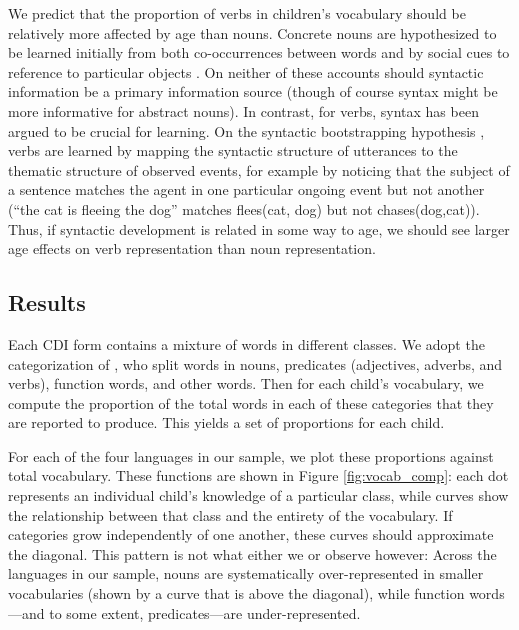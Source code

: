 \documentclass[10pt,letterpaper]{article}
\begin{document}
We predict that the proportion of verbs in children's vocabulary should be relatively more affected by age than nouns. Concrete nouns are hypothesized to be learned initially from both co-occurrences between words \cite{yu2007b} and by social cues to reference to particular objects \cite{bloom2002}. On neither of these accounts should syntactic information be a primary information source (though of course syntax might be more informative for abstract nouns). In contrast, for verbs, syntax has been argued to be crucial for learning. On the syntactic bootstrapping hypothesis \cite{gleitman1990,fisher1994}, verbs are learned by  mapping the syntactic structure of utterances to the thematic structure of observed events, for example by noticing that the subject of a sentence matches the agent in one particular ongoing event but not another (``the cat is fleeing the dog'' matches  {\sc flees(cat, dog)} but not {\sc chases(dog,cat)}). Thus, if syntactic development is related in some way to age, we should see larger age effects on verb representation than noun representation. 

\subsection{Results}

Each CDI form contains a mixture of words in different classes. We adopt the categorization of , who split words in nouns, predicates (adjectives, adverbs, and verbs), function words, and other words. Then for each child's vocabulary, we compute the proportion of the total words in each of these categories that they are reported to produce. This yields a set of proportions for each child.

For each of the four languages in our sample, we plot these proportions against total vocabulary. These functions are shown in Figure \ref{fig:vocab_comp}: each dot represents an individual child's knowledge of a particular class, while curves show the relationship between that class and the entirety of the vocabulary. If categories grow independently of one another, these curves should approximate the diagonal. This pattern is not what either we or \citeauthor{bates1994} observe however: Across the languages in our sample, nouns are systematically over-represented in smaller vocabularies (shown by a curve that is above the diagonal), while function words---and to some extent, predicates---are under-represented. 
\end{document}
